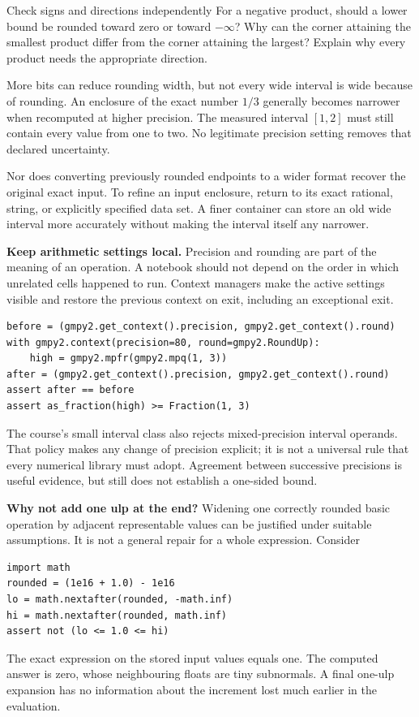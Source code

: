 \begin{question}{Check signs and directions independently}
For a negative product, should a lower bound be rounded toward zero or toward
$-\infty$? Why can the corner attaining the smallest product differ from the corner
attaining the largest? Explain why every product needs the appropriate direction.
\end{question}

\newpage
{}
More bits can reduce rounding width, but not every wide interval is wide because
of rounding. An enclosure of the exact number $1/3$ generally becomes narrower
when recomputed at higher precision. The measured interval $[1,2]$ must still
contain every value from one to two. No legitimate precision setting removes
that declared uncertainty.

Nor does converting previously rounded endpoints to a wider format recover the
original exact input. To refine an input enclosure, return to its exact rational,
string, or explicitly specified data set. A finer container can store an old wide
interval more accurately without making the interval itself any narrower.

\textbf{Keep arithmetic settings local.} Precision and rounding are part of the
meaning of an operation. A notebook should not depend on the order in which
unrelated cells happened to run. Context managers make the active settings visible
and restore the previous context on exit, including an exceptional exit.
\begin{lstlisting}
before = (gmpy2.get_context().precision, gmpy2.get_context().round)
with gmpy2.context(precision=80, round=gmpy2.RoundUp):
    high = gmpy2.mpfr(gmpy2.mpq(1, 3))
after = (gmpy2.get_context().precision, gmpy2.get_context().round)
assert after == before
assert as_fraction(high) >= Fraction(1, 3)
\end{lstlisting}
The course's small interval class also rejects mixed-precision interval operands.
That policy makes any change of precision explicit; it is not a universal rule
that every numerical library must adopt. Agreement between successive precisions
is useful evidence, but still does not establish a one-sided bound.

\textbf{Why not add one ulp at the end?} Widening one correctly rounded basic
operation by adjacent representable values can be justified under suitable
assumptions. It is not a general repair for a whole expression. Consider
\begin{lstlisting}
import math
rounded = (1e16 + 1.0) - 1e16
lo = math.nextafter(rounded, -math.inf)
hi = math.nextafter(rounded, math.inf)
assert not (lo <= 1.0 <= hi)
\end{lstlisting}
The exact expression on the stored input values equals one. The computed answer
is zero, whose neighbouring floats are tiny subnormals. A final one-ulp expansion
has no information about the increment lost much earlier in the evaluation.

